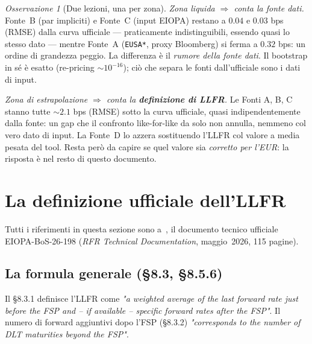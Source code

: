 \documentclass[11pt,a4paper]{article}
\theoremstyle{definition}
\theoremstyle{remark}
\newtheorem*{osservazione}{Osservazione}
\begin{document}
\begin{osservazione}[Due lezioni, una per zona]
\emph{Zona liquida $\Rightarrow$ conta la fonte dati.} Fonte~B (par impliciti) e Fonte~C
(input EIOPA) restano a $0.04$ e $0.03$ bps (RMSE) dalla curva ufficiale --- praticamente
indistinguibili, essendo quasi lo stesso dato --- mentre Fonte~A (\texttt{EUSA*}, proxy
Bloomberg) si ferma a $0.32$ bps: un ordine di grandezza peggio. La differenza \`e il
\emph{rumore della fonte dati}. Il bootstrap in s\'e \`e esatto (re-pricing $\sim 10^{-16}$);
ci\`o che separa le fonti dall'ufficiale sono i dati di input.

\emph{Zona di estrapolazione $\Rightarrow$ conta la \textbf{definizione di LLFR}.} Le Fonti A,
B, C stanno tutte $\sim 2.1$ bps (RMSE) sotto la curva ufficiale, quasi indipendentemente
dalla fonte: un gap che il confronto like-for-like da solo non annulla, nemmeno col vero dato
di input. La Fonte~D lo azzera sostituendo l'LLFR col valore a media pesata del tool. Resta
per\`o da capire se quel valore sia \emph{corretto per l'EUR}: la risposta \`e nel resto di
questo documento.
\end{osservazione}

\section{La definizione ufficiale dell'LLFR}
\label{sec:doc-ufficiale}

Tutti i riferimenti in questa sezione sono a~\cite{eiopa2026}, il documento tecnico ufficiale
EIOPA-BoS-26-198 (\textit{RFR Technical Documentation}, maggio~2026, 115 pagine).

\subsection{La formula generale (§8.3, §8.5.6)}
\label{sec:formula-generale}

Il §8.3.1 definisce l'LLFR come \emph{"a weighted average of the last forward rate just before
the FSP and -- if available -- specific forward rates after the FSP"}. Il numero di forward
aggiuntivi dopo l'FSP (§8.3.2) \emph{"corresponds to the number of DLT maturities beyond the
FSP"}.
\end{document}
